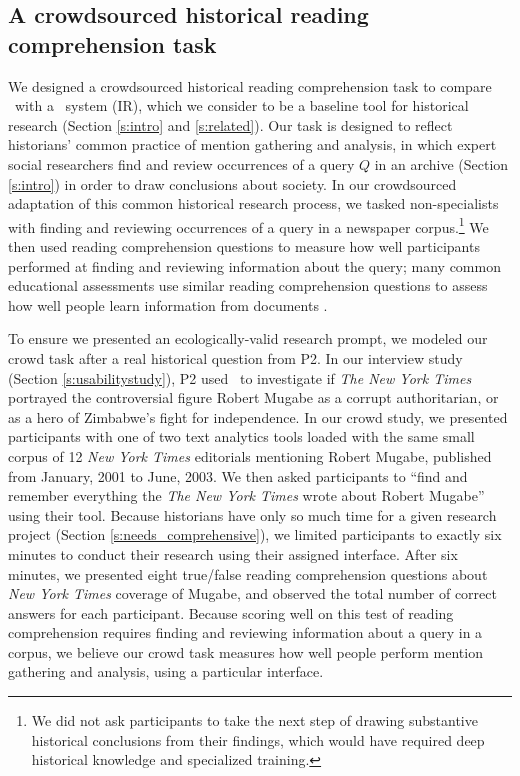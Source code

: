 
\subsection{A crowdsourced historical reading comprehension task}
We designed a crowdsourced historical reading comprehension task to compare \ours~with a \Baselongname~system (IR),
 which we consider to be a baseline tool for historical research (Section \ref{s:intro} and \ref{s:related}).
Our task is designed to reflect historians' common practice of mention gathering and analysis, in which expert social researchers find and review occurrences of a query $Q$ in an archive (Section \ref{s:intro}) in order
to draw conclusions about society.
In our crowdsourced adaptation of this common historical research process, we tasked non-specialists with finding and reviewing occurrences of a query in a newspaper corpus.\footnote{We did not ask participants to take the next step of drawing substantive historical conclusions from their findings, which would have required deep historical knowledge and specialized training.}
We then used reading comprehension questions to measure how well participants performed at finding and reviewing information about the query;
many common educational assessments use similar reading comprehension questions to assess how well people learn information from documents \cite[Chp.\ 7]{reading_comp}.

To ensure we presented an ecologically-valid research prompt, we modeled our crowd task after a real historical question from P2. 
In our interview study (Section \ref{s:usabilitystudy}), P2 used \ours~to investigate if \textit{The New York Times} portrayed the controversial figure Robert Mugabe as a corrupt authoritarian, or as a hero of Zimbabwe's fight for independence. 
In our crowd study, we presented participants with one of two text analytics tools loaded with the same small corpus of 12 \textit{New York Times} editorials mentioning Robert Mugabe, published from January, 2001 to June, 2003. 
We then asked participants to ``find and remember everything the \textit{The New York Times} wrote about Robert Mugabe'' using their tool.
Because historians have only so much time for a given research project (Section \ref{s:needs_comprehensive}), we limited participants to exactly six minutes to conduct their research using their assigned interface. After six minutes, we presented eight true/false reading comprehension questions about \textit{New York Times} coverage of Mugabe, and observed the total number of correct answers for each participant.
Because scoring well on this test of reading comprehension requires finding and reviewing information about a query in a corpus, we believe our crowd task measures how well people perform mention gathering and analysis, using a particular interface.

